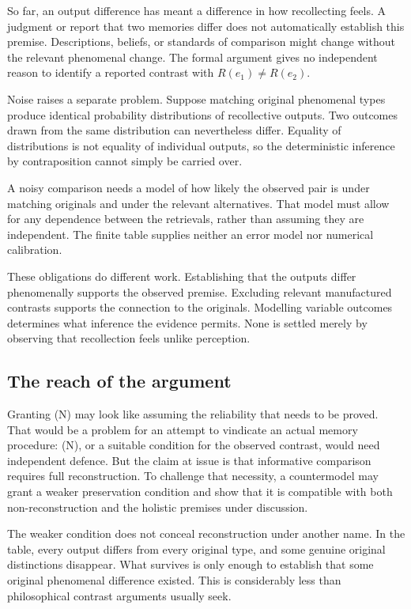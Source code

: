 So far, an output difference has meant a difference in how recollecting feels. A judgment or report that two memories differ does not automatically establish this premise. Descriptions, beliefs, or standards of comparison might change without the relevant phenomenal change. The formal argument gives no independent reason to identify a reported contrast with \(R(e_1)\ne R(e_2)\).

Noise raises a separate problem. Suppose matching original phenomenal types produce identical probability distributions of recollective outputs. Two outcomes drawn from the same distribution can nevertheless differ. Equality of distributions is not equality of individual outputs, so the deterministic inference by contraposition cannot simply be carried over.

A noisy comparison needs a model of how likely the observed pair is under matching originals and under the relevant alternatives. That model must allow for any dependence between the retrievals, rather than assuming they are independent. The finite table supplies neither an error model nor numerical calibration.

These obligations do different work. Establishing that the outputs differ phenomenally supports the observed premise. Excluding relevant manufactured contrasts supports the connection to the originals. Modelling variable outcomes determines what inference the evidence permits. None is settled merely by observing that recollection feels unlike perception.

\subsection*{The reach of the argument}

Granting (N) may look like assuming the reliability that needs to be proved. That would be a problem for an attempt to vindicate an actual memory procedure: (N), or a suitable condition for the observed contrast, would need independent defence. But the claim at issue is that informative comparison requires full reconstruction. To challenge that necessity, a countermodel may grant a weaker preservation condition and show that it is compatible with both non-reconstruction and the holistic premises under discussion.

The weaker condition does not conceal reconstruction under another name. In the table, every output differs from every original type, and some genuine original distinctions disappear. What survives is only enough to establish that some original phenomenal difference existed. This is considerably less than philosophical contrast arguments usually seek.


